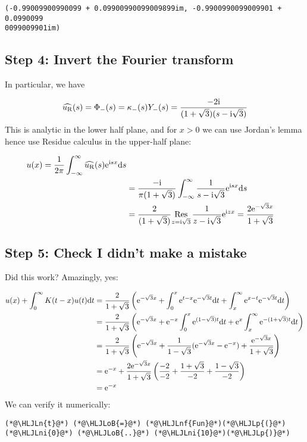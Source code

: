 \documentclass[12pt,landscape]{article}
\newcommand{\HLJLn}[1]{#1}
\newcommand{\HLJLnf}[1]{\textcolor[RGB]{66,102,213}{#1}}
\newcommand{\HLJLni}[1]{\textcolor[RGB]{59,151,46}{#1}}
\newcommand{\HLJLoB}[1]{\textcolor[RGB]{102,102,102}{\textbf{#1}}}
\newcommand{\HLJLp}[1]{#1}
\def\D{ {\rm d} }
\def\I{ {\rm i} }
\def\E{ {\rm e} }
\def\Res_#1{\underset{#1}{\rm Res}\,}
\def\addtab#1={#1\;&=}
\def\ccr{\\\addtab}
\def\dt{\D t}
\def\ds{\D s}
\def\addtab#1={#1\;&=}
\def\ccr{\\\addtab}
\begin{document}
{\begin{lstlisting}
(-0.99009900990099 + 0.09900990099009899im, -0.9900990099009901 + 0.0990099
0099009901im)
\end{lstlisting}


\subsection{Step 4: Invert the Fourier transform}
In particular, we have

\[
\widehat{u_{\rm R}}(s) = \Phi_-(s) = \kappa_-(s) Y_-(s) =  {-2 \I \over (1+\sqrt{3})(s-\I \sqrt 3)}
\]
This is analytic in the lower half plane, and for $x > 0$ we can use Jordan's lemma hence use Residue calculus in the upper-half plane:


\begin{align*}
u(x) = {1 \over 2 \pi} \int_{-\infty}^\infty \widehat{u_{\rm R}}(s) \E^{\I s x} \ds  \ccr
= {-\I \over \pi(1+\sqrt{3})} \int_{-\infty}^\infty {1 \over s-\I \sqrt 3} \E^{\I s x} \ds  \ccr
= {2   \over (1+\sqrt{3})} \Res_{z=\I \sqrt 3} {1 \over z-\I \sqrt 3} \E^{\I z x}  =
{2 \E^{-\sqrt{3}x}    \over 1+\sqrt{3}}
\end{align*}
\subsection{Step 5: Check I didn't make a mistake}
Did this work? Amazingly, yes:


\begin{align*}
u(x) + \int_0^\infty K(t -x) u(t) \dt &= {2   \over 1+\sqrt{3}} \left(  \E^{-\sqrt{3}x}  +   \int_0^x \E^{t-x} \E^{-\sqrt{3}t} \dt +  \int_x^\infty \E^{x-t} \E^{-\sqrt{3}t}\dt \right) \\
&={2    \over 1+\sqrt{3}}\left( \E^{-\sqrt{3}x}   +  \E^{-x}    \int_0^x \E^{(1-\sqrt{3})t} \dt + \E^x  \int_x^\infty  \E^{-(1+\sqrt{3})t}\dt \right) \\
&={2     \over 1+\sqrt{3}}\left( \E^{-\sqrt{3}x}  + {1  \over 1-\sqrt 3}   (\E^{-\sqrt{3}x} - \E^{-x}) + { \E^{-\sqrt 3 x } \over 1+\sqrt{3}} \right) \\
&=\E^{-x} + {2  \E^{-\sqrt{3}x}   \over 1+\sqrt{3}}\left({-2 \over -2}   + {1+ \sqrt 3  \over -2} + {1 - \sqrt 3 \over -2} \right)  \\
&= \E^{-x}
\end{align*}
We can verify it numerically:


\begin{lstlisting}
(*@\HLJLn{t}@*) (*@\HLJLoB{=}@*) (*@\HLJLnf{Fun}@*)(*@\HLJLp{(}@*)(*@\HLJLni{0}@*) (*@\HLJLoB{..}@*) (*@\HLJLni{10}@*)(*@\HLJLp{)}@*)


\end{lstlisting}}
\end{document}
